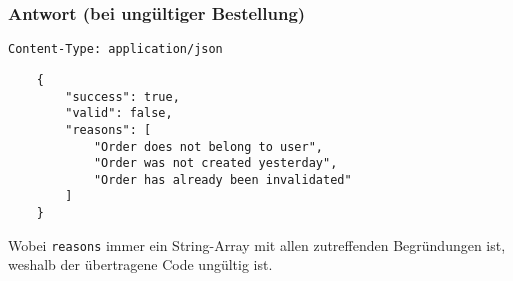 \subsubsection{Antwort (bei ungültiger Bestellung)}

\lstinline{Content-Type: application/json}
\begin{lstlisting}
    {
        "success": true, 
        "valid": false,
        "reasons": [
            "Order does not belong to user",
            "Order was not created yesterday",
            "Order has already been invalidated"
        ]
    }
\end{lstlisting}

Wobei \lstinline{reasons} immer ein String-Array mit allen zutreffenden Begründungen ist, weshalb der übertragene Code ungültig ist.